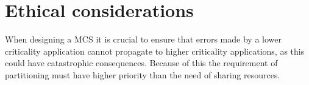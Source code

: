 

\section{Ethical considerations}
When designing a MCS it is crucial to ensure that errors made by a lower criticality application cannot propagate to higher criticality applications, as this could have catastrophic consequences. Because of this the requirement of partitioning must have higher priority than the need of sharing resources.

\newpage
\mbox{}


